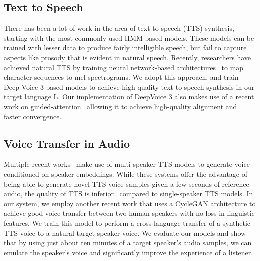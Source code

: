 \documentclass[sigconf]{acmart}
\begin{document}
\subsection{Text to Speech}
There has been a lot of work in the area of text-to-speech (TTS) synthesis, starting with the most commonly used HMM-based models\cite{zen2009statistical}. These models can be trained with lesser data to produce fairly intelligible speech, but fail to capture aspects like prosody that is evident in natural speech. Recently, researchers have achieved natural TTS by training neural network-based architectures~\cite{shen2018natural,ping2017deep} to map character sequences to mel-spectrograms. We adopt this approach, and train Deep Voice 3\cite{ping2017deep} based models to achieve high-quality text-to-speech synthesis in our target language L. Our implementation of DeepVoice 3 also makes use of a recent work on guided-attention~\cite{tachibana2018efficiently} allowing it to achieve high-quality alignment and faster convergence. 

\subsection{Voice Transfer in Audio}
Multiple recent works~\cite{ping2017deep,arik2018neural} make use of multi-speaker TTS models to generate voice conditioned on speaker embeddings. While these systems offer the advantage of being able to generate novel TTS voice samples given a few seconds of reference audio, the quality of TTS is inferior~\cite{ping2017deep} compared to single-speaker TTS models. In our system, we employ another recent work\cite{kaneko2017parallel} that uses a CycleGAN architecture to achieve good voice transfer between two human speakers with no loss in linguistic features. We train this model to perform a cross-language transfer of a synthetic TTS voice to a natural target speaker voice. We evaluate our models and show that by using just about ten minutes of a target speaker's audio samples, we can emulate the speaker's voice and significantly improve the experience of a listener.
\end{document}
